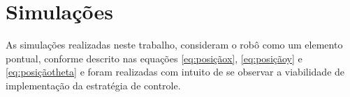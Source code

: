 \chapter{Simulações}
\label{chap:Simulacoes}

As simulações realizadas neste trabalho, consideram o robô como um elemento pontual, conforme descrito nas equações \ref{eq:posiçãox}, \ref{eq:posiçãoy} e \ref{eq:posiçãotheta} e foram realizadas com intuito de se observar a viabilidade de implementação da estratégia de controle. 